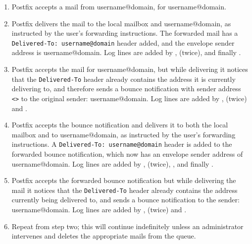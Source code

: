 \begin{enumerate}

    \item Postfix accepts a mail from username@domain, for username@domain.

    \item Postfix delivers the mail to the local mailbox and
        username@domain, as instructed by the user's forwarding
        instructions. The forwarded mail has a
        \texttt{Delivered-To:~username@domain} header added, and the
        envelope sender address is username@domain.  Log lines are added by
        ,  (twice),  and finally
        .

    \item Postfix accepts the mail for username@domain, but while
        delivering it notices that the \texttt{Delivered-To} header already
        contains the address it is currently delivering to, and therefore
        sends a bounce notification with sender address \texttt{<>} to
        the original sender: username@domain.  Log lines are added by
        ,  (twice) and .

    \item Postfix accepts the bounce notification and delivers it to both
        the local mailbox and to username@domain, as instructed by the
        user's forwarding instructions.  A
        \texttt{Delivered-To:~username@domain} header is added to the
        forwarded bounce notification, which now has an envelope sender
        address of username@domain.  Log lines are added by ,
         (twice), , and finally
        .

    \item Postfix accepts the forwarded bounce notification but while
        delivering the mail it notices that the \texttt{Delivered-To}
        header already contains the address currently being delivered to,
        and sends a bounce notification to the sender: username@domain.
        Log lines are added by ,  (twice) and
        .

    \item Repeat from step two; this will continue indefinitely unless an
        administrator intervenes and deletes the appropriate mails from the
        queue.

\end{enumerate}

